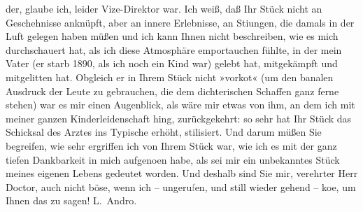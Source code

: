\begin{ledgroupsized}[t]{13cm}
               der, glaube ich, \introOben{}leider\introOben{} Vize-Direktor war. Ich weiß, daß Ihr
                  Stück nicht an Geschehnisse
               anknüpft, aber an innere Erlebnisse, an Sti{\geminationm}ungen, die
               damals in der Luft gelegen haben müßen und ich kann Ihnen nicht beschreiben, wie es
               mich durchschauert hat, als ich diese Atmosphäre emportauchen fühlte, in der mein Vater (er starb
                  1890, als ich noch ein Kind war) gelebt hat, mitgekämpft und
               mitgelitten hat. Obgleich er in Ihrem Stück nicht »vorko{\geminationm}t« (um den banalen Ausdruck der Leute zu gebrauchen, die dem dichterischen Schaffen
               ganz ferne stehen) war es mir einen Augenblick, als wäre mir etwas von ihm, an dem
               ich mit meiner ganzen Kinderleidenschaft hing, zurückgekehrt: so sehr hat Ihr Stück das Schicksal des Arztes ins
               Typische erhöht, stilisiert. Und darum müßen Sie begreifen, wie sehr ergriffen ich
               von Ihrem Stück war, wie ich {\pb}es mit der ganz tiefen Dankbarkeit in mich aufgeno{\geminationm}en habe, als sei mir ein unbekanntes Stück meines
               eigenen Lebens gedeutet worden. Und deshalb sind Sie mir, verehrter Herr Doctor, auch
               nicht böse, wenn ich – ungeru\textcolor{gray}{f}en, und still wieder gehend – ko{\geminationm}e, um Ihnen das zu sagen!\pend
           \pstart \spacefill\mbox{L. Andro.}\pend{}          \endnumbering{}\end{ledgroupsized}  \newcommand{\dateiname}{L02570}\newcommand{\titel}{Therese Rie-Andro an Arthur Schnitzler, 29. 11. 1912}\newcommand{\editorInnen}{Martin Anton Müller und Gerd-Hermann Susen}
            \footnotesize
\begin{ledgroupsized}[t]{11.5cm}
\end{ledgroupsized}
         
      